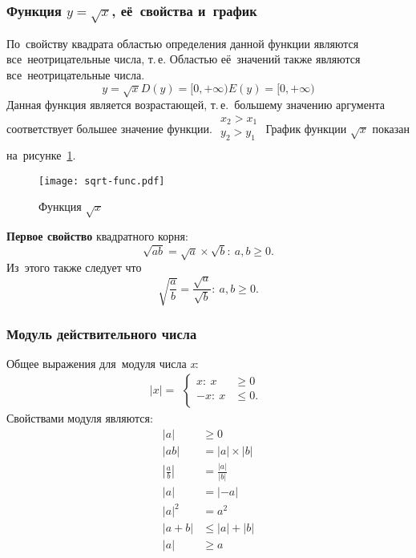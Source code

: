 \documentclass[]{scrartcl}
\begin{document}
\subsubsection{Функция $y=\sqrt{x}$, её~свойства и~график}
По~свойству квадрата областью определения данной функции являются все~неотрицательные числа, т.\,е. Областью её~значений также являются все~неотрицательные числа.
\begin{equation}\label{eq:sqrt-function-domain}
y=\sqrt{x}
D(y)=[0,+\infty)
E(y)=[0,+\infty)
\end{equation}
Данная функция является возрастающей, т.\,е.~большему значению аргумента соответствует большее значение функции.
$\begin{aligned}
x_2>x_1\\
y_2>y_1\\
\end{aligned}$
График функции $\sqrt{x}$ показан на~рисунке~\ref{fig:sqrt-func}.
\begin{figure}[ht]
	\centering %
	\texttt{[image: sqrt-func.pdf]}
	\caption{Функция $\sqrt{x}$}\label{fig:sqrt-func}
\end{figure}

\textbf{Первое свойство} квадратного корня:
\begin{equation}\label{sqrt-prop-1}
\sqrt{ab}=\sqrt{a} \times \sqrt{b}:\ a,b \geq 0.
\end{equation}
Из~этого также следует что
\begin{equation}\label{sqrt-prop-2}
\sqrt{\frac{a}{b}}=\frac{\sqrt{a}}{\sqrt{b}}:\ a,b \geq 0.
\end{equation}

\subsubsection{Модуль действительного числа}
Общее выражения для~модуля числа \textit{x}: 
\begin{equation}\label{eq:modul}
|x|=\begin{aligned} \begin{cases}
x:\ x &\geq 0\\
-x:\ x &\leq 0.\\
\end{cases}
\end{aligned}
\end{equation}
Свойствами модуля являются:
\begin{equation}\label{eq:module-properties}
\begin{aligned}
|a| &\geq 0\\
|ab| &= |a|\times|b|\\
|\frac{a}{b}| &= \frac{|a|}{|b|}\\
|a|&=|-a|\\
|a|^2&=a^2\\
|a+b| &\leq |a|+|b|\\
|a| &\geq a\\
\end{aligned}
\end{equation}
\end{document}
